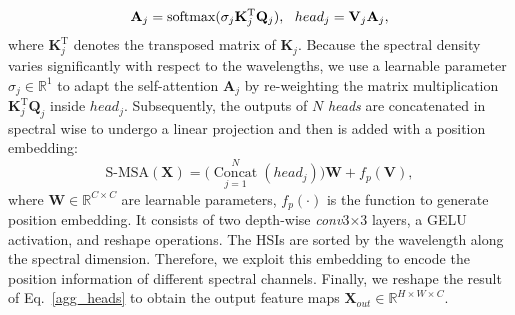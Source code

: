 \documentclass[10pt,twocolumn,letterpaper]{article}
\begin{document}
\vspace{-0.2mm}
\begin{equation}
	\mathbf{A}_j = \text{softmax}(\sigma_j \mathbf{K}_j^\text{T} \mathbf{Q}_j), ~~{head}_j  =\mathbf{V}_j \mathbf{A}_j, 
	\label{s-attention}
\vspace{-0.2mm}
\end{equation}
where $\mathbf{K}_j^\text{T}$ denotes the transposed matrix of $\mathbf{K}_j$. Because the spectral density varies significantly with respect to the wavelengths, we use a learnable parameter $\sigma_j \in \mathbb{R}^{1}$ to adapt the self-attention $\mathbf{A}_j$ by re-weighting the matrix multiplication $\mathbf{K}_j^\text{T} \mathbf{Q}_j$ inside $head_j$. Subsequently, the outputs of $N$ \emph{heads} are concatenated in spectral wise to undergo a linear projection and then is added with a position embedding:
\begin{equation}
\text{S-MSA}(\mathbf{X}) =\big(\mathop{\text{Concat}}\limits_{j=1}^{N}(head_{j})\big)\mathbf{W} + f_p(\mathbf{V}),
\label{agg_heads}
\end{equation}
where $\mathbf{W} \in \mathbb{R}^{C \times C}$ are learnable parameters, $f_p(\cdot)$ is the function to generate position embedding. It consists of two depth-wise \emph{conv}3$\times$3 layers, a GELU activation, and reshape operations. The HSIs are sorted by the wavelength along the spectral dimension. Therefore, we exploit this embedding to encode the position information of different spectral channels. Finally, we reshape the result of Eq.~\eqref{agg_heads} to obtain the output feature maps $\mathbf{X}_{out} \in \mathbb{R}^{H\times W \times C}$.
\end{document}
